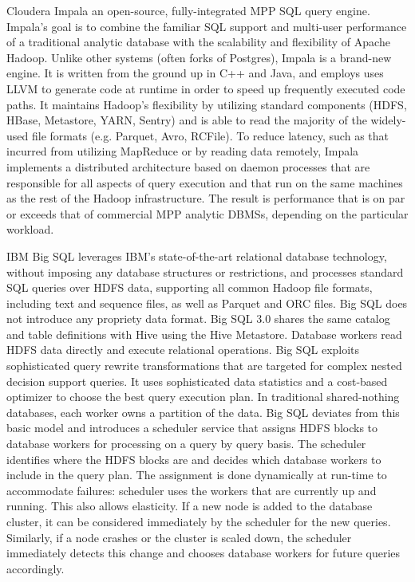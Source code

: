 \documentclass{vldb}
\begin{document}
Cloudera Impala \cite{Kornacker+15} an open-source, fully-integrated MPP SQL query engine. Impala's goal is to combine the familiar SQL support and multi-user performance of a traditional analytic database with the scalability and flexibility of Apache Hadoop. Unlike other systems (often forks of Postgres), Impala is a brand-new engine. It is written from the ground up in C++ and Java, and employs uses LLVM to generate code at runtime in order to speed up frequently executed code paths. It maintains Hadoop's flexibility by utilizing standard components (HDFS, HBase, Metastore, YARN, Sentry) and is able to read the majority of the widely-used file formats (e.g. Parquet, Avro, RCFile). To reduce latency, such as that incurred from utilizing MapReduce or by reading data remotely, Impala implements a distributed architecture based on daemon processes that are responsible for all aspects of query execution and that run on the same machines as the rest of the Hadoop infrastructure. The result is performance that is on par or exceeds that of commercial MPP analytic DBMSs, depending on the particular workload. 

IBM Big SQL \cite{bigsql} leverages IBM's state-of-the-art relational database technology, without imposing any database structures or restrictions, and processes standard SQL queries over HDFS data, supporting all common Hadoop file formats, including text and sequence files, as well as Parquet and ORC files. Big SQL does not introduce any propriety data format. Big SQL 3.0 shares the same catalog and table definitions with Hive using the Hive Metastore. Database workers read HDFS data directly and execute relational operations. Big SQL exploits sophisticated query rewrite transformations \cite{pirahesh96, winmagic} that are targeted for complex nested decision support queries. It uses sophisticated data statistics and a cost-based optimizer to choose the best query execution plan.  In traditional shared-nothing databases, each worker owns a partition of the data. Big SQL deviates from this basic model and introduces a scheduler service that assigns HDFS blocks to database workers for processing on a query by query basis. The scheduler identifies where the HDFS blocks are and decides which database workers to include in the query plan. The assignment is done dynamically at run-time to accommodate failures: scheduler uses the workers that are currently up and running. This also allows elasticity. If a new node is added to the database cluster, it can be considered immediately by the scheduler for the new queries. Similarly, if a node crashes or the cluster is scaled down, the scheduler immediately detects this change and chooses database workers for future queries accordingly. 
\end{document}
